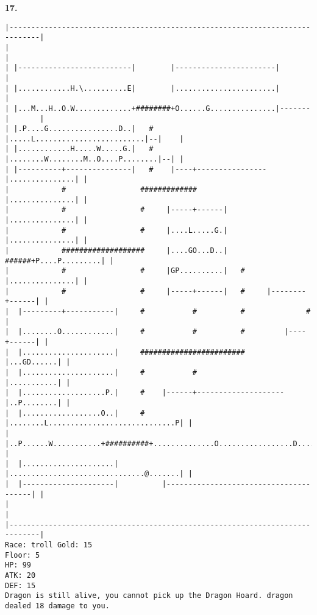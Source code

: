 \documentclass[11pt]{article}
\theoremstyle{plain}
\begin{document}
\newpage
\textbf{17. }
\begin{Verbatim}[fontsize=\scriptsize]
|-----------------------------------------------------------------------------|
|                                                                             |
| |--------------------------|        |-----------------------|               |
| |............H.\..........E|        |.......................|               |
| |...M...H..O.W.............+########+O......G...............|-------|       |
| |.P....G................D..|   #    |.....L.........................|--|    |
| |............H.....W.....G.|   #    |........W........M..O....P........|--| |
| |----------+---------------|   #    |----+----------------|...............| |
|            #                 #############                |...............| |
|            #                 #     |-----+------|         |...............| |
|            #                 #     |....L.....G.|         |...............| |
|            ###################     |....GO...D..|   ######+P....P.........| |
|            #                 #     |GP..........|   #     |...............| |
|            #                 #     |-----+------|   #     |--------+------| |
|  |---------+-----------|     #           #          #              #        |
|  |........O............|     #           #          #         |----+------| |
|  |.....................|     ########################         |...GD......| |
|  |.....................|     #           #                    |...........| |
|  |...................P.|     #    |------+--------------------|..P........| |
|  |..................O..|     #    |........L.............................P| |
|  |..P......W...........+##########+..............O.................D......| |
|  |.....................|          |...............................@.......| |
|  |---------------------|          |---------------------------------------| |
|                                                                             |
|-----------------------------------------------------------------------------|
Race: troll Gold: 15                                                   Floor: 5
HP: 99
ATK: 20
DEF: 15
Dragon is still alive, you cannot pick up the Dragon Hoard. dragon dealed 18 damage to you. 
\end{Verbatim}
\end{document}
